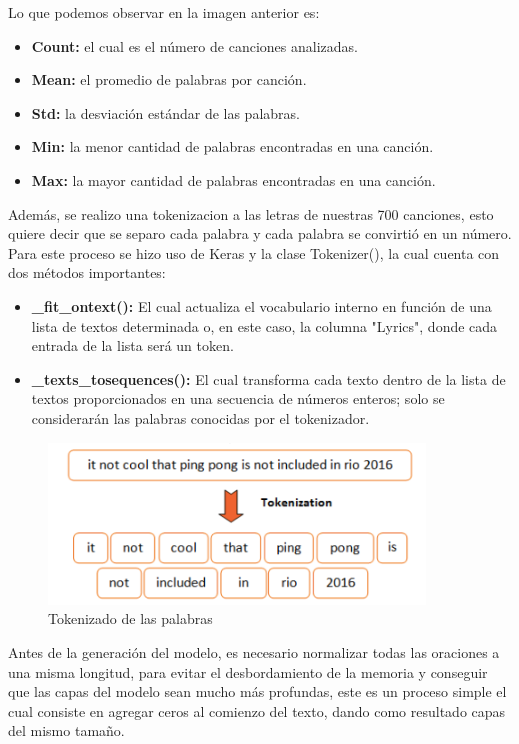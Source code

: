 \documentclass[12pt, a4paper, titlepage]{report}
\begin{document}
Lo que podemos observar en la imagen anterior es:
\begin{itemize}
	\item \textbf{Count:} el cual es el número de canciones analizadas.
	\item \textbf{Mean:} el promedio de palabras por canción.
	\item \textbf{Std:} la desviación estándar de las palabras.
	\item \textbf{Min:} la menor cantidad de palabras encontradas en una canción.
	\item \textbf{Max:} la mayor cantidad de palabras encontradas en una canción.
\end{itemize}
Además, se realizo una tokenizacion a las letras de nuestras 700 canciones, esto quiere decir que se separo cada palabra y cada palabra se convirtió en un número. Para este proceso se hizo uso de Keras y la clase Tokenizer(), la cual cuenta con dos métodos importantes:
\begin{itemize}
	\item \textbf{\_fit\_ontext():} El cual actualiza el vocabulario interno en función de una lista de textos determinada o, en este caso, la columna "Lyrics", donde cada entrada de la lista será un token.
	\item \textbf{\_texts\_tosequences():} El cual transforma cada texto dentro de la lista de textos proporcionados en una secuencia de números enteros; solo se considerarán las palabras conocidas por el tokenizador.
\end{itemize}	
\begin{figure}[H]
	\includegraphics[width=10cm]{./imagenes/Desarrollo/Kaggle/tokenization.png}
	\centering 
	\caption{Tokenizado de las palabras \cite{tokenimagen}}
\end{figure}
Antes de la generación del modelo, es necesario normalizar todas las oraciones a una misma longitud, para evitar el desbordamiento de la memoria y conseguir que las capas del modelo sean mucho más profundas, este es un proceso simple el cual consiste en agregar ceros al comienzo del texto, dando como resultado capas del mismo tamaño.\\\\
\end{document}

